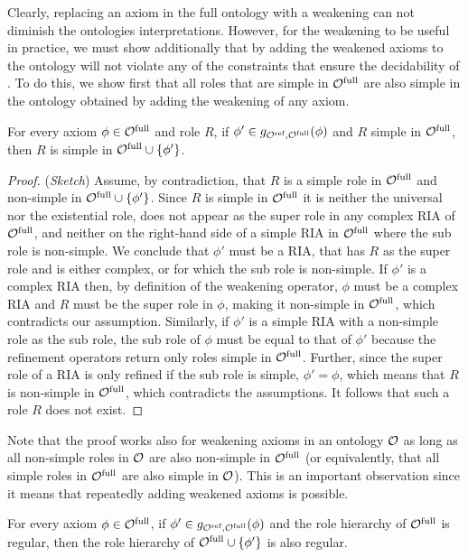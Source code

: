 \documentclass[
]{ceurart}
\begin{document}
Clearly, replacing an axiom in the full ontology with a weakening can not diminish the ontologies interpretations. However, for the weakening to be useful in practice, we must show additionally that by adding the weakened axioms to the ontology will not violate any of the constraints that ensure the decidability of \SROIQ. To do this, we show first that all roles that are simple in ${\mathcal{O}^\textnormal{full}}$ are also simple in the ontology obtained by adding the weakening of any axiom.

\begin{lemma} \label{lem:simple-roles}
  For every axiom $\phi \in {\mathcal{O}^\textnormal{full}}$ and role $R$, if $\phi' \in g_{{\mathcal{O}^\textnormal{ref}},{\mathcal{O}^\textnormal{full}}}(\phi)$ and $R$ simple in ${\mathcal{O}^\textnormal{full}}$, then $R$ is simple in ${\mathcal{O}^\textnormal{full}} \cup \{ \phi' \}$.
\end{lemma}

\begin{proof}(\emph{Sketch})
  Assume, by contradiction, that $R$ is a simple role in ${\mathcal{O}^\textnormal{full}}$ and non-simple in ${\mathcal{O}^\textnormal{full}} \cup \{ \phi' \}$. Since $R$ is simple in ${\mathcal{O}^\textnormal{full}}$ it is neither the universal nor the existential role, does not appear as the super role in any complex RIA of ${\mathcal{O}^\textnormal{full}}$, and neither on the right-hand side of a simple RIA in ${\mathcal{O}^\textnormal{full}}$ where the sub role is non-simple. We conclude that $\phi'$ must be a RIA, that has $R$ as the super role and is either complex, or for which the sub role is non-simple. If $\phi'$ is a complex RIA then, by definition of the weakening operator, $\phi$ must be a complex RIA and $R$ must be the super role in $\phi$, making it non-simple in ${\mathcal{O}^\textnormal{full}}$, which contradicts our assumption. Similarly, if $\phi'$ is a simple RIA with a non-simple role as the sub role, the sub role of $\phi$ must be equal to that of $\phi'$ because the refinement operators return only roles simple in ${\mathcal{O}^\textnormal{full}}$. Further, since the super role of a RIA is only refined if the sub role is simple, $\phi' = \phi$, which means that $R$ is non-simple in ${\mathcal{O}^\textnormal{full}}$, which contradicts the assumptions. It follows that such a role $R$ does not exist.
\end{proof}

Note that the proof works also for weakening axioms in an ontology $\mathcal{O}$ as long as all non-simple roles in $\mathcal{O}$ are also non-simple in ${\mathcal{O}^\textnormal{full}}$ (or equivalently, that all simple roles in ${\mathcal{O}^\textnormal{full}}$ are also simple in $\mathcal{O}$). This is an important observation since it means that repeatedly adding weakened axioms is possible.

\begin{lemma} \label{lem:regularity}
  For every axiom $\phi \in {\mathcal{O}^\textnormal{full}}$, if $\phi' \in g_{{\mathcal{O}^\textnormal{ref}},{\mathcal{O}^\textnormal{full}}}(\phi)$ and the role hierarchy of ${\mathcal{O}^\textnormal{full}}$ is regular, then the role hierarchy of ${\mathcal{O}^\textnormal{full}} \cup \{ \phi' \}$ is also regular.
\end{lemma}
\end{document}
